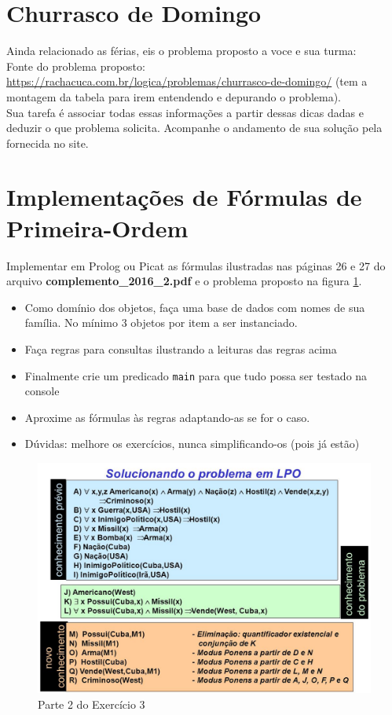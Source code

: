 \documentclass[a4paper,12pt]{article}
\begin{document}
\section{Churrasco de Domingo}

Ainda relacionado as férias, eis o problema proposto a voce e sua turma:\\
 Fonte do problema proposto:\\
 \url{https://rachacuca.com.br/logica/problemas/churrasco-de-domingo/}
 (tem a montagem da tabela para irem entendendo e depurando o problema).\\


\vspace{1.5cm}
 Sua tarefa é associar todas essas informações a partir dessas dicas dadas e deduzir o que problema solicita. Acompanhe o andamento de sua solução pela fornecida no site.
\newpage
\section{Implementações de Fórmulas de Primeira-Ordem}

Implementar em Prolog ou Picat as fórmulas ilustradas nas páginas
26 e 27 do arquivo   \textbf{complemento\_2016\_2.pdf} e o problema proposto 
na figura \ref{fig_01}.
 \begin{itemize}
   \item Como domínio dos objetos, faça uma base de dados com nomes de sua família.
   No mínimo 3 objetos por item a ser instanciado.
   \item Faça regras para consultas ilustrando a leituras das regras acima
   \item Finalmente crie um predicado \texttt{main} para que tudo possa ser testado na console
   \item Aproxime as fórmulas às regras adaptando-as se for o caso.
   \item Dúvidas: melhore os exercícios, nunca simplificando-os (pois já estão)
 \end{itemize}


\begin{figure}[h!]
\centering
 \includegraphics[scale=0.5]{figuras/exercicio_logica_01.jpg}
 \caption{Parte 2 do Exercício 3}
 \label{fig_01}
\end{figure}
\end{document}
